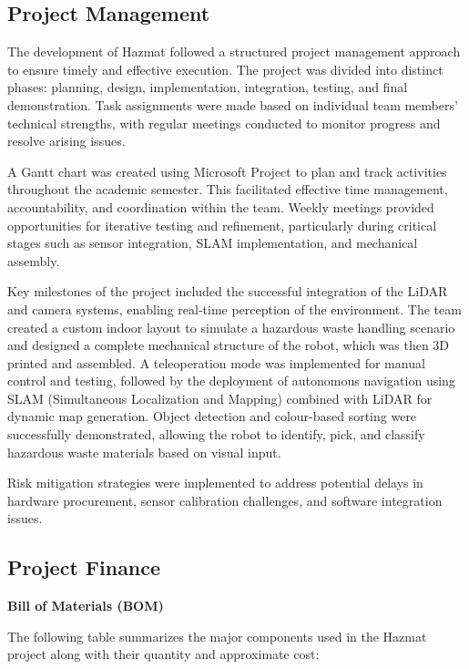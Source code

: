 \documentclass{article}
\begin{document}
\subsection{Project Management}

The development of Hazmat followed a structured project management approach to ensure timely and effective execution. The project was divided into distinct phases: planning, design, implementation, integration, testing, and final demonstration. Task assignments were made based on individual team members' technical strengths, with regular meetings conducted to monitor progress and resolve arising issues. 

A Gantt chart was created using Microsoft Project to plan and track activities throughout the academic semester. This facilitated effective time management, accountability, and coordination within the team. Weekly meetings provided opportunities for iterative testing and refinement, particularly during critical stages such as sensor integration, SLAM implementation, and mechanical assembly. 

Key milestones of the project included the successful integration of the LiDAR and camera systems, enabling real-time perception of the environment. The team created a custom indoor layout to simulate a hazardous waste handling scenario and designed a complete mechanical structure of the robot, which was then 3D printed and assembled. A teleoperation mode was implemented for manual control and testing, followed by the deployment of autonomous navigation using SLAM (Simultaneous Localization and Mapping) combined with LiDAR for dynamic map generation. Object detection and colour-based sorting were successfully demonstrated, allowing the robot to identify, pick, and classify hazardous waste materials based on visual input. 

Risk mitigation strategies were implemented to address potential delays in hardware procurement, sensor calibration challenges, and software integration issues. 

\subsection{Project Finance}

\textbf{Bill of Materials (BOM)} 

The following table summarizes the major components used in the Hazmat project along with their quantity and approximate cost:
\end{document}
